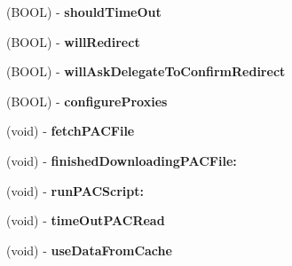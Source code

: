 \begin{DoxyCompactItemize}
\item 
\hypertarget{interface_a_s_i_h_t_t_p_request_07_08_acedb1516f19af14df7b44602b700bae3}{
(\-B\-O\-O\-L) -\/ {\bfseries should\-Time\-Out}}
\label{interface_a_s_i_h_t_t_p_request_07_08_acedb1516f19af14df7b44602b700bae3}

\item 
\hypertarget{interface_a_s_i_h_t_t_p_request_07_08_af19d1ede897c67a86b4d8a62c6395863}{
(\-B\-O\-O\-L) -\/ {\bfseries will\-Redirect}}
\label{interface_a_s_i_h_t_t_p_request_07_08_af19d1ede897c67a86b4d8a62c6395863}

\item 
\hypertarget{interface_a_s_i_h_t_t_p_request_07_08_a38bb6d3bfc36a47f3ace0665762660ae}{
(\-B\-O\-O\-L) -\/ {\bfseries will\-Ask\-Delegate\-To\-Confirm\-Redirect}}
\label{interface_a_s_i_h_t_t_p_request_07_08_a38bb6d3bfc36a47f3ace0665762660ae}

\item 
\hypertarget{interface_a_s_i_h_t_t_p_request_07_08_a81e707733dd891e98faf51eb37093845}{
(\-B\-O\-O\-L) -\/ {\bfseries configure\-Proxies}}
\label{interface_a_s_i_h_t_t_p_request_07_08_a81e707733dd891e98faf51eb37093845}

\item 
\hypertarget{interface_a_s_i_h_t_t_p_request_07_08_a88a7f8b0dfa6f7cc8214d8b52282c6e6}{
(void) -\/ {\bfseries fetch\-P\-A\-C\-File}}
\label{interface_a_s_i_h_t_t_p_request_07_08_a88a7f8b0dfa6f7cc8214d8b52282c6e6}

\item 
\hypertarget{interface_a_s_i_h_t_t_p_request_07_08_af285a652c6aa3f3b35d7e38d81cac828}{
(void) -\/ {\bfseries finished\-Downloading\-P\-A\-C\-File\-:}}
\label{interface_a_s_i_h_t_t_p_request_07_08_af285a652c6aa3f3b35d7e38d81cac828}

\item 
\hypertarget{interface_a_s_i_h_t_t_p_request_07_08_ac7a6d20750ee1df4ce04ee025b012164}{
(void) -\/ {\bfseries run\-P\-A\-C\-Script\-:}}
\label{interface_a_s_i_h_t_t_p_request_07_08_ac7a6d20750ee1df4ce04ee025b012164}

\item 
\hypertarget{interface_a_s_i_h_t_t_p_request_07_08_a831dd38482b5178ecb6b5a3a73d2d6b4}{
(void) -\/ {\bfseries time\-Out\-P\-A\-C\-Read}}
\label{interface_a_s_i_h_t_t_p_request_07_08_a831dd38482b5178ecb6b5a3a73d2d6b4}

\item 
\hypertarget{interface_a_s_i_h_t_t_p_request_07_08_a7cd96b5cbd524b2110451f6ff7b36f85}{
(void) -\/ {\bfseries use\-Data\-From\-Cache}}
\label{interface_a_s_i_h_t_t_p_request_07_08_a7cd96b5cbd524b2110451f6ff7b36f85}


\end{DoxyCompactItemize}
